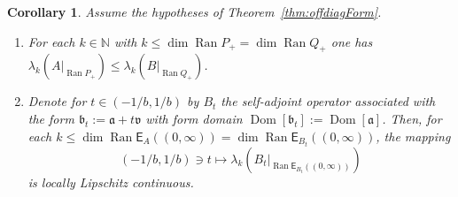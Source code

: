 \documentclass[11pt,a4paper]{amsart}
\numberwithin{equation}{section}
\DeclareMathOperator{\Ran}{Ran}
\DeclareMathOperator{\Dom}{Dom}
\newcommand{\NN}{\mathbb{N}}
\newcommand{\EE}{\mathsf{E}}
\newcommand{\fa}{{\mathfrak a}}
\newcommand{\fb}{{\mathfrak b}}
\newcommand{\fv}{{\mathfrak v}}
\theoremstyle{plain}
\newtheorem{corollary}[theorem]{Corollary}
\theoremstyle{definition}
\theoremstyle{remark}
\begin{document}
\begin{corollary}\label{cor:offForm}
  Assume the hypotheses of Theorem~\ref{thm:offdiagForm}.
  \begin{enumerate}
    \renewcommand{\theenumi}{\alph{enumi}}

    \item For each $k \in \NN$ with $k \le \dim\Ran P_+ = \dim\Ran Q_+$ one has
          $\lambda_k(A|_{\Ran P_+}) \le \lambda_k(B|_{\Ran Q_+})$.

    \item Denote for $t \in (-1/b , 1/b)$ by $B_t$ the self-adjoint operator associated with the form $\fb_t := \fa + t\fv$ with
          form domain $\Dom[\fb_t] := \Dom[\fa]$. Then, for each
          $k \le \dim\Ran\EE_A((0,\infty)) = \dim\Ran\EE_{B_t}((0,\infty))$, the mapping
          \begin{equation*}
            ( -1/b , 1/b )
            \ni
            t
            \mapsto
            \lambda_k(B_t|_{\Ran\EE_{B_t}((0,\infty))})
          \end{equation*}
          is locally Lipschitz continuous.

  \end{enumerate}
\end{corollary}
\end{document}
